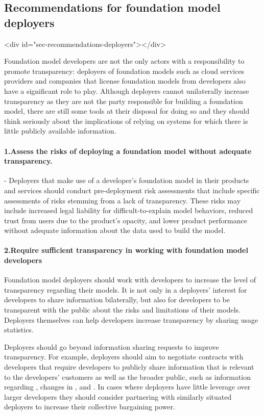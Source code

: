 \documentclass[screen, authorversion, acmsmall]{acmart}
\begin{document}
\hypertarget{recommendations-deployers}{\subsection{Recommendations for foundation model deployers}}
<div id="sec-recommendations-deployers"></div>

Foundation model developers are not the only actors with a responsibility to promote transparency: deployers of foundation models such as cloud services providers and companies that license foundation models from developers also have a significant role to play. 
Although deployers cannot unilaterally increase transparency as they are not the party responsible for building a foundation model, there are still some tools at their disposal for doing so and they should think seriously about the implications of relying on systems for which there is little publicly available information. 

\paragraph{1.\phantom{X}Assess the risks of deploying a foundation model without adequate transparency.} 
-  Deployers that make use of a developer's foundation model in their products and services should conduct pre-deployment risk assessments that include specific assessments of risks stemming from a lack of transparency. These risks may include increased legal liability for difficult-to-explain model behaviors, reduced trust from users due to the product's opacity, and lower product performance without adequate information about the data used to build the model.
 \paragraph{2.\phantom{X}Require sufficient transparency in working with foundation model developers} 
\begin{myitemize}
\item Foundation model deployers should work with developers to increase the level of transparency regarding their models. 
It is not only in a deployers' interest for developers to share information bilaterally, but also for developers to be transparent with the public about the risks and limitations of their models. 
Deployers themselves can help developers increase transparency by sharing usage statistics.
\item Deployers should go beyond information sharing requests to improve transparency. 
For example, deployers should aim to negotiate contracts with developers that require developers to publicly share information that is relevant to the developers' customers as well as the broader public, such as information regarding \updates, changes in \usagepolicy, and \impact. 
In cases where deployers have little leverage over larger developers they should consider partnering with similarly situated deployers to increase their collective bargaining power. 
\end{myitemize}
\end{document}
